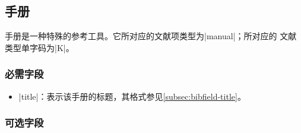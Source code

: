 
\subsection{手册}\label{subsec:bibtype-manual}

手册是一种特殊的参考工具。它所对应的{\BibTeX}文献项类型为|manual|；所对应的
文献类型单字码为|K|\cite{gbt3469-1983}。

\subsubsection{必需字段}

\begin{itemize}
\item |title|：表示该手册的标题，其格式参见\ref{subsec:bibfield-title}。
\end{itemize}

\subsubsection{可选字段}


